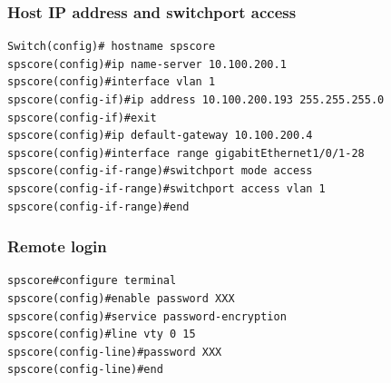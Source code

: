\documentclass[a4paper,notitlepage]{article}
\begin{document}
\subsubsection{Host IP address and switchport access}

\begin{verbatim}
Switch(config)# hostname spscore
spscore(config)#ip name-server 10.100.200.1
spscore(config)#interface vlan 1
spscore(config-if)#ip address 10.100.200.193 255.255.255.0
spscore(config-if)#exit
spscore(config)#ip default-gateway 10.100.200.4
spscore(config)#interface range gigabitEthernet1/0/1-28
spscore(config-if-range)#switchport mode access 
spscore(config-if-range)#switchport access vlan 1
spscore(config-if-range)#end
\end{verbatim}

\subsubsection{Remote login}

\begin{verbatim}
spscore#configure terminal
spscore(config)#enable password XXX
spscore(config)#service password-encryption 
spscore(config)#line vty 0 15
spscore(config-line)#password XXX
spscore(config-line)#end
\end{verbatim}
\end{document}
